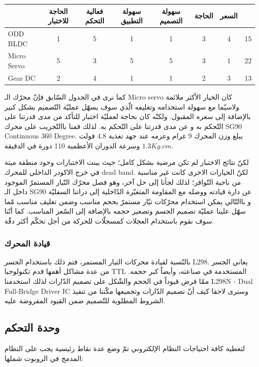 \begin{table}[h]
	\begin{tabular}{lccccccc|}
		\cline{2-8}
		\multicolumn{1}{l|}{} & الحاجة للاختبار  &  فعالية التحكم & سهولة التطبيق & سهولة التصميم  & الحاجة  & السعر &    \\ \hline
		\multicolumn{1}{|l}{ODD BLDC} & 1 & 5 & 1 & 1 & 3 & 4 & 15 \\ \hline
		\multicolumn{1}{|l}{Micro Servo}  & 5 & 3 & 5 & 5 & 3 & 1 & 22 \\ \hline
		\multicolumn{1}{|l}{Gear DC}        & 2 & 4 & 1 & 1 & 2 & 3 & 13 \\ \hline
	\end{tabular}
\end{table}


كما نرى في الجدول السّابق فإنّ محرّك الـ Micro servo كان الخيار الأكثر ملائمة ولاسيّما مع سهولة استخدامه وتغليفه الّذي سوف يسهّل عمليّة التّصميم بشكل كبير  بالإضافة إلى سعره المقبول. ولكنّه كان بحاجة لعمليّة اختبار للتأكد من مدى قدرتنا على التّحكم به و عن مدى قدرتنا على التّحكم به. لذلك قمنا باالتّجريب على محرك SG90 Continuous 360 Degree. يبلغ وزن المحرك 9 غرام وعزمه عند جهد تغذية 4.8 فولت $1.3 Kg.cm$ وسرعة الدوران الأعظمية 110 دورة في الدقيقة.

لكنّ نتائج الاختبار لم تكن مرضية بشكل كامل؛ حيث بينت الاختبارات وجود منطقة ميتة في خرج الاكودر الداخلي للمحرك dead band. لكنّ الخيارات الاخرى كانت غير مناسبة من ناحية التّوافر؛ لذلك لجأنا إلى حل آخر، وهو فصل محرّك التّيار المستمرّ الموجود داخل الـ SG90  عن دارة قيادته ووصله مع المقاومة المتغيّرة الدّاخلية إلى دراتنا السفليّة و باالتّالي يمكن استخدام محرّكات تيّار مستمرّ بحجم مناسب وضمن تغليف مناسب مّما سهّل علينا عمليّة تصميم الجسم وتصغير حجمه بالإضافة إلى السّعر المناسب. كما أنّنا سوف نقوم باستخدام العجلات كمسجلّات للحركة من أجل تحكّم أكثر دقّة.

\subsubsection*{قيادة المحرك}
 بالنّسبة لقيادة محركات التيار المستمر، فتم ذلك باستخدام الجسر L298. يعاني الجسر من عدة مشاكل أهمها قدم تكنولوجيا TTL المستخدمة في صناعته، وأيضاً كبر حجمه. ممّا فرض قيوداً في الحجم والشّكل على تصميم الدّارات  لذلك استخدمنا L298N - Dual Full-Bridge Driver IC وسنرى لاحقا كيف أنّ تصميم الدّارات وتجميعها مكّننا من تنفيذ الشروط المطلوبة للتّصميم ضمن القيود المفروضة عليه.
 
\subsection{وحدة التحكم}
لتغطية كافة احتياجات النظام الإلكتروني تمّ وضع عدة نقاط رئيسية يجب على النظام المدمج في الروبوت شملها:

